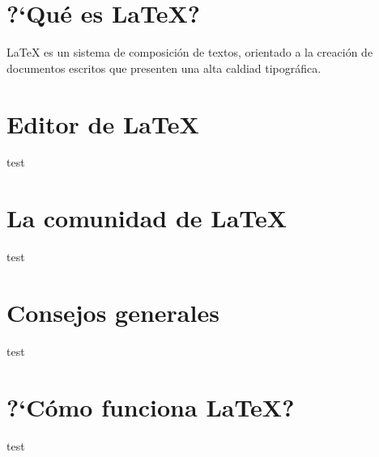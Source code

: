 \documentclass[../notes.tex]{subfiles}
\begin{document}
    \section{?`Qué es {\LaTeX}?}
	
        {\LaTeX} es un sistema de composición de textos, orientado a la creación de documentos escritos que presenten una alta caldiad tipográfica.
        

        
    \section{Editor de {\LaTeX}}

        test
        
    \section{La comunidad de {\LaTeX}}

        test
        
    \section{Consejos generales}
        
        test
        
    \section{?`Cómo funciona {\LaTeX}?}

        test
\end{document}
